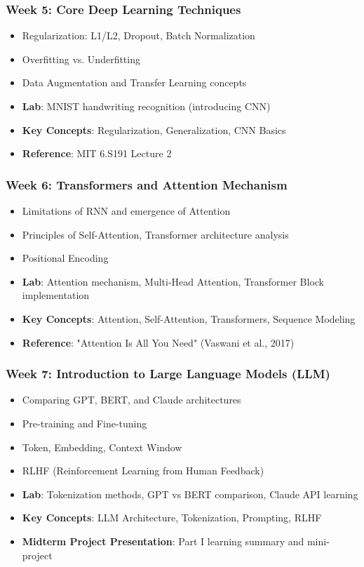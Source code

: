 \documentclass[11pt,a4paper]{article}
\begin{document}
\subsubsection*{Week 5: Core Deep Learning Techniques}
\begin{itemize}[noitemsep]
    \item Regularization: L1/L2, Dropout, Batch Normalization
    \item Overfitting vs. Underfitting
    \item Data Augmentation and Transfer Learning concepts
    \item \textbf{Lab}: MNIST handwriting recognition (introducing CNN)
    \item \textbf{Key Concepts}: Regularization, Generalization, CNN Basics
    \item \textbf{Reference}: MIT 6.S191 Lecture 2
\end{itemize}

\subsubsection*{Week 6: Transformers and Attention Mechanism}
\begin{itemize}[noitemsep]
    \item Limitations of RNN and emergence of Attention
    \item Principles of Self-Attention, Transformer architecture analysis
    \item Positional Encoding
    \item \textbf{Lab}: Attention mechanism, Multi-Head Attention, Transformer Block implementation
    \item \textbf{Key Concepts}: Attention, Self-Attention, Transformers, Sequence Modeling
    \item \textbf{Reference}: "Attention Is All You Need" (Vaswani et al., 2017)
\end{itemize}

\subsubsection*{Week 7: Introduction to Large Language Models (LLM)}
\begin{itemize}[noitemsep]
    \item Comparing GPT, BERT, and Claude architectures
    \item Pre-training and Fine-tuning
    \item Token, Embedding, Context Window
    \item RLHF (Reinforcement Learning from Human Feedback)
    \item \textbf{Lab}: Tokenization methods, GPT vs BERT comparison, Claude API learning
    \item \textbf{Key Concepts}: LLM Architecture, Tokenization, Prompting, RLHF
    \item \textbf{Midterm Project Presentation}: Part I learning summary and mini-project
\end{itemize}
\end{document}
